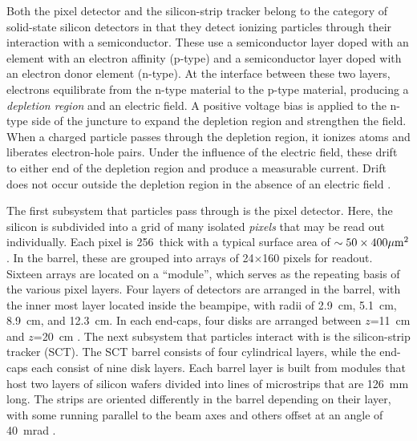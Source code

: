 Both the pixel detector and the silicon-strip tracker belong to the category of solid-state silicon detectors in that they detect ionizing particles through their interaction with a semiconductor.
These use a semiconductor layer doped with an element with an electron affinity (p-type) and a semiconductor layer doped with an electron donor element (n-type).
At the interface between these two layers, electrons equilibrate from the n-type material to the p-type material, producing a \emph{depletion region} and an electric field.
A positive voltage bias is applied to the n-type side of the juncture to expand the depletion region and strengthen the field.
When a charged particle passes through the depletion region, it ionizes atoms and liberates electron-hole pairs.
Under the influence of the electric field, these drift to either end of the depletion region and produce a measurable current.
Drift does not occur outside the depletion region in the absence of an electric field \cite{grupen}.

The first subsystem that particles pass through is the pixel detector.
Here, the silicon is subdivided into a grid of many isolated \emph{pixels} that may be read out individually.
Each pixel is 256~\um thick with a typical surface area of $\sim50\times400\mu\text{m}^2$.
In the barrel, these are grouped into arrays of 24$\times$160 pixels for readout.
Sixteen arrays are located on a ``module'', which serves as the repeating basis of the various pixel layers.
Four layers of detectors are arranged in the barrel, with the inner most layer located inside the beampipe, with radii of 2.9~cm, 5.1~cm, 8.9~cm, and 12.3~cm. 
In each end-caps, four disks are arranged between $z$=11~cm and $z$=20~cm \cite{pixel,pixel2}.
The next subsystem that particles interact with is the silicon-strip tracker (SCT).
The SCT barrel consists of four cylindrical layers, while the end-caps each consist of nine disk layers.
Each barrel layer is built from modules that host two layers of silicon wafers divided into lines of microstrips that are 126~mm long.
The strips are oriented differently in the barrel depending on their layer, with some running parallel to the beam axes and others offset at an angle of 40~mrad \cite{sct}.

